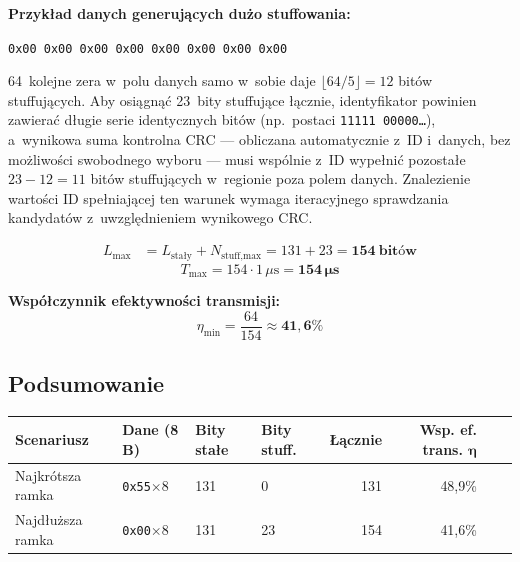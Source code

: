 \documentclass[12pt,a4paper]{article}
\begin{document}
\textbf{Przykład danych generujących dużo stuffowania:}
\begin{center}
\texttt{0x00 0x00 0x00 0x00 0x00 0x00 0x00 0x00}
\end{center}
64~kolejne zera w~polu danych samo w~sobie daje
$\lfloor 64/5 \rfloor = 12$ bitów stuffujących.
Aby osiągnąć 23~bity stuffujące łącznie, identyfikator powinien zawierać
długie serie identycznych bitów (np.\ postaci \texttt{11111\,00000\ldots}),
a~wynikowa suma kontrolna CRC — obliczana automatycznie z~ID i~danych,
bez możliwości swobodnego wyboru — musi wspólnie z~ID wypełnić pozostałe
$23 - 12 = 11$ bitów stuffujących w~regionie poza polem danych.
Znalezienie wartości ID spełniającej ten warunek wymaga iteracyjnego
sprawdzania kandydatów z~uwzględnieniem wynikowego CRC.

\begin{align*}
L_{\max} &= L_{\text{stały}} + N_{\text{stuff,max}} = 131 + 23 = \mathbf{154\ \text{bitów}}
\end{align*}
\[
\boxed{T_{\max} = 154 \cdot 1\,\mu\text{s} = \mathbf{154\,\mu\text{s}}}
\]

\textbf{Współczynnik efektywności transmisji:}
\[
\eta_{\min} = \frac{64}{154} \approx \mathbf{41{,}6\%}
\]

\subsection*{Podsumowanie}

\begin{center}
\begin{tabular}{llllrrrr}
\toprule
\textbf{Scenariusz} & \textbf{Dane (8 B)} & \textbf{Bity stałe} & \textbf{Bity stuff.} & \textbf{Łącznie} & \textbf{Wsp. ef. trans. $\bm{\eta}$} \\
\midrule
Najkrótsza ramka & \texttt{0x55}$\times$8 & 131 & 0  & 131 & 48,9\% \\
Najdłuższa ramka & \texttt{0x00}$\times$8 & 131 & 23 & 154 & 41,6\% \\
\bottomrule
\end{tabular}
\end{center}


\end{document}

